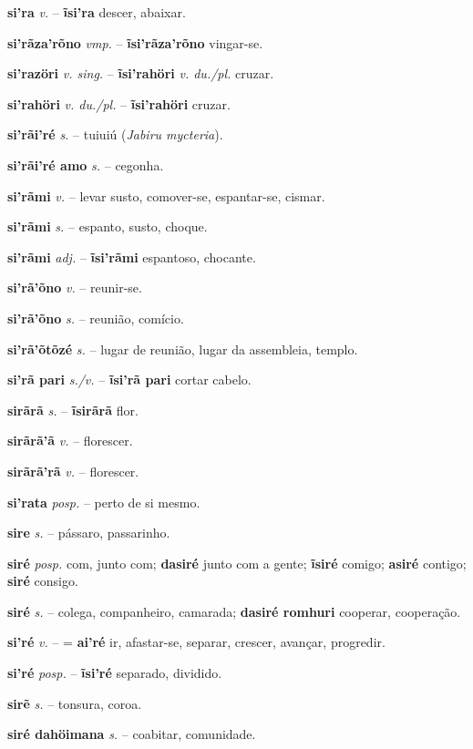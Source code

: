 \textbf{si'ra} \textit{v.} -- \textbf{ĩsi'ra} descer, abaixar.

\textbf{si'rãza'rõno} \textit{vmp.} -- \textbf{ĩsi'rãza'rõno} vingar-se.

\textbf{si'razöri} \textit{v. sing.} -- \textbf{ĩsi'rahöri} \textit{v. du./pl.} cruzar.

\textbf{si'rahöri} \textit{v. du./pl.} -- \textbf{ĩsi'rahöri} cruzar.

\textbf{si'rãi'ré} \textit{s.} -- tuiuiú (\textit{Jabiru mycteria}).

\textbf{si'rãi'ré amo} \textit{s.} -- cegonha.

\textbf{si'rãmi} \textit{v.} -- levar susto, comover-se, espantar-se, cismar.

\textbf{si'rãmi} \textit{s.} -- espanto, susto, choque.

\textbf{si'rãmi} \textit{adj.} -- \textbf{ĩsi'rãmi} espantoso, chocante.

\textbf{si'rã'õno} \textit{v.} -- reunir-se.

\textbf{si'rã'õno} \textit{s.} -- reunião, comício.

\textbf{si'rã'õtõzé} \textit{s.} -- lugar de reunião, lugar da assembleia, templo.

\textbf{si'rã pari} \textit{s./v.} -- \textbf{ĩsi'rã pari} cortar cabelo.

\textbf{sirãrã} \textit{s.} -- \textbf{ĩsirãrã} flor.

\textbf{sirãrã'ã} \textit{v.} -- florescer.

\textbf{sirãrã'rã} \textit{v.} -- florescer.

\textbf{si'rata} \textit{posp.} -- perto de si mesmo.

\textbf{sire} \textit{s.} -- pássaro, passarinho.

\textbf{siré} \textit{posp.} com, junto com; \textbf{dasiré} junto com a gente; \textbf{ĩsiré} comigo; \textbf{asiré} contigo; \textbf{siré} consigo.

\textbf{siré} \textit{s.} -- colega, companheiro, camarada; \textbf{dasiré romhuri} cooperar, cooperação.

\textbf{si'ré} \textit{v.} -- = \textbf{ai'ré} ir, afastar-se, separar, crescer, avançar, progredir.

\textbf{si'ré} \textit{posp.} -- \textbf{ĩsi'ré} separado, dividido.

\textbf{sirẽ} \textit{s.} -- tonsura, coroa.

\textbf{siré dahöimana} \textit{s.} -- coabitar, comunidade.

